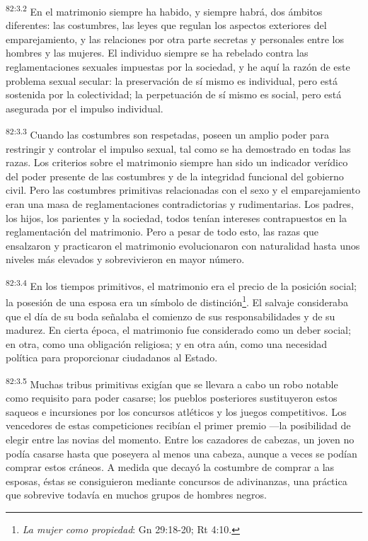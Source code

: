 \documentclass[twoside, 11pt]{book}
\begin{document}
\par
\textsuperscript{82:3.2} En el matrimonio siempre ha habido, y siempre habrá, dos ámbitos diferentes: las costumbres, las leyes que regulan los aspectos exteriores del emparejamiento, y las relaciones por otra parte secretas y personales entre los hombres y las mujeres. El individuo siempre se ha rebelado contra las reglamentaciones sexuales impuestas por la sociedad, y he aquí la razón de este problema sexual secular: la preservación de sí mismo es individual, pero está sostenida por la colectividad; la perpetuación de sí mismo es social, pero está asegurada por el impulso individual.

\par
\textsuperscript{82:3.3} Cuando las costumbres son respetadas, poseen un amplio poder para restringir y controlar el impulso sexual, tal como se ha demostrado en todas las razas. Los criterios sobre el matrimonio siempre han sido un indicador verídico del poder presente de las costumbres y de la integridad funcional del gobierno civil. Pero las costumbres primitivas relacionadas con el sexo y el emparejamiento eran una masa de reglamentaciones contradictorias y rudimentarias. Los padres, los hijos, los parientes y la sociedad, todos tenían intereses contrapuestos en la reglamentación del matrimonio. Pero a pesar de todo esto, las razas que ensalzaron y practicaron el matrimonio evolucionaron con naturalidad hasta unos niveles más elevados y sobrevivieron en mayor número.

\par
\textsuperscript{82:3.4} En los tiempos primitivos, el matrimonio era el precio de la posición social; la posesión de una esposa era un símbolo de distinción\footnote{\textit{La mujer como propiedad}: Gn 29:18-20; Rt 4:10.}. El salvaje consideraba que el día de su boda señalaba el comienzo de sus responsabilidades y de su madurez. En cierta época, el matrimonio fue considerado como un deber social; en otra, como una obligación religiosa; y en otra aún, como una necesidad política para proporcionar ciudadanos al Estado.

\par
\textsuperscript{82:3.5} Muchas tribus primitivas exigían que se llevara a cabo un robo notable como requisito para poder casarse; los pueblos posteriores sustituyeron estos saqueos e incursiones por los concursos atléticos y los juegos competitivos. Los vencedores de estas competiciones recibían el primer premio ---la posibilidad de elegir entre las novias del momento. Entre los cazadores de cabezas, un joven no podía casarse hasta que poseyera al menos una cabeza, aunque a veces se podían comprar estos cráneos. A medida que decayó la costumbre de comprar a las esposas, éstas se consiguieron mediante concursos de adivinanzas, una práctica que sobrevive todavía en muchos grupos de hombres negros.
\end{document}
